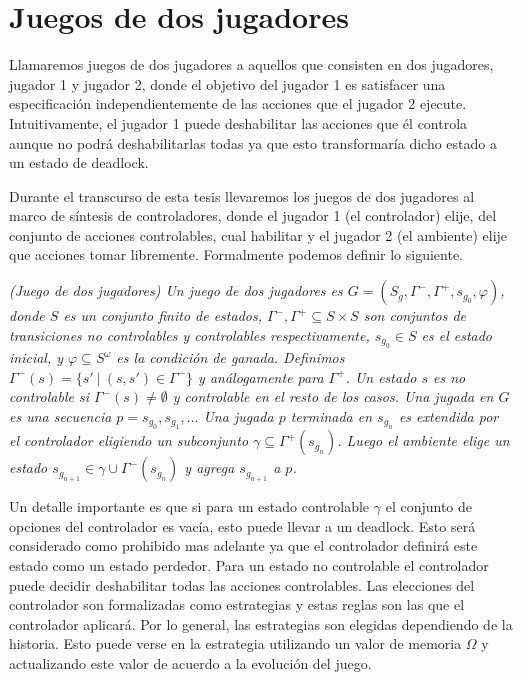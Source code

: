\section{Juegos de dos jugadores}

Llamaremos juegos de dos jugadores a aquellos que consisten en dos jugadores, jugador 1 y jugador 2, donde el objetivo
del jugador 1 es satisfacer una especificación independientemente de las acciones que el jugador 2 ejecute.
Intuitivamente, el jugador 1 puede deshabilitar las acciones que él controla aunque no podrá deshabilitarlas todas ya
que esto transformaría dicho estado a un estado de deadlock.

Durante el transcurso de esta tesis llevaremos los juegos de dos jugadores al marco de síntesis de controladores, donde
el jugador 1 (el controlador) elije, del conjunto de acciones controlables, cual habilitar y el jugador 2 (el ambiente)
elije que acciones tomar libremente. Formalmente podemos definir lo siguiente.

\begin{nahaDef}
    \emph{(Juego de dos jugadores) Un juego de dos jugadores es $G = (S_g, \Gamma^-, \Gamma^+, s_{g_0}, \varphi)$, donde
    $S$ es un conjunto finito de estados, $\Gamma^-, \Gamma^+ \subseteq S \times S$ son conjuntos de transiciones no
    controlables y controlables respectivamente, $s_{g_0} \in S$ es el estado inicial, y $\varphi \subseteq S^\omega$ es
    la condición de ganada. Definimos $\Gamma^-(s) = \{s'\ |\ (s,s') \in \Gamma^-\}$ y análogamente para $\Gamma^+$. Un
    estado $s$ es no controlable si $\Gamma^-(s) \neq \emptyset$ y controlable en el resto de los casos. Una jugada en
    $G$ es una secuencia $p = s_{g_0}, s_{g_1},...$ Una jugada $p$ terminada en $s_{g_n}$ es extendida por el
    controlador eligiendo un subconjunto $\gamma \subseteq \Gamma^+(s_{g_n})$. Luego el ambiente elige un estado
    $s_{g_{n+1}} \in \gamma \cup \Gamma^-(s_{g_n})$ y agrega $s_{g_{n+1}}$ a $p$.}
\end{nahaDef}

Un detalle importante es que si para un estado controlable $\gamma$ el conjunto de opciones del controlador es vacía, esto
puede llevar a un deadlock. Esto será considerado como prohibido mas adelante ya que el controlador definirá este estado
como un estado perdedor. Para un estado no controlable el controlador puede decidir deshabilitar todas las acciones
controlables. Las elecciones del controlador son formalizadas como estrategias y estas reglas son las que el controlador
aplicará. Por lo general, las estrategias son elegidas dependiendo de la historia. Esto puede verse en la estrategia
utilizando un valor de memoria $\Omega$ y actualizando este valor de acuerdo a la evolución del juego.

